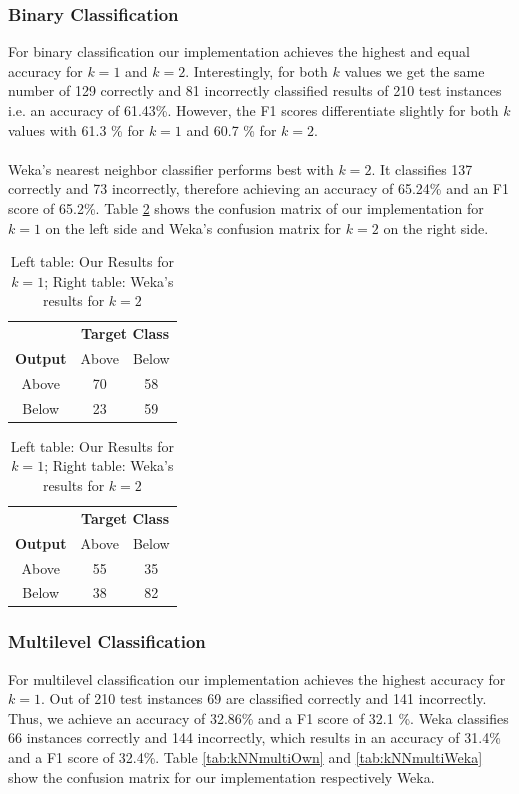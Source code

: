 \subsubsection{Binary Classification}
For binary classification our implementation achieves the highest and equal accuracy for $ k = 1 $ and $ k = 2$. Interestingly, for both $k$ values we get the same number of 129 correctly and 81 incorrectly classified results of 210 test instances i.e. an accuracy of 61.43\%. However, the F1 scores differentiate slightly for both $k$ values with 61.3 \% for $k = 1$ and 60.7 \% for $k = 2$. \\
\\
Weka's nearest neighbor classifier performs best with $k = 2$. It classifies 137 correctly and 73 incorrectly, therefore achieving an accuracy of 65.24\% and an F1 score of 65.2\%. Table \ref{tab:kNNbin} shows the confusion matrix of our implementation for $k=1$ on the left side and Weka's confusion matrix for $k = 2$ on the right side.
\begin{table}[h]
\begin{center}
  \begin{tabular}{c|cc}
  & \multicolumn{2}{c}{\textbf{Target Class}} \\
 \textbf{Output} & Above & Below\\ \hline
  Above & 70 & 58 \\
  Below & 23 & 59
\end{tabular}
\quad
\begin{tabular}{c|cc}
  & \multicolumn{2}{c}{\textbf{Target Class}} \\
 \textbf{Output} & Above & Below\\ \hline
  Above & 55 & 35 \\
  Below & 38 & 82
\end{tabular}
\caption{Left table: Our Results for $k = 1$; Right table: Weka's results for $k = 2$ }
\label{tab:kNNbin}
\end{center}
\end{table}

\subsubsection{Multilevel Classification}
For multilevel classification our implementation achieves the highest accuracy for $ k = 1$. Out of 210 test instances 69 are classified correctly and 141 incorrectly. Thus, we achieve an accuracy of 32.86\% and a F1 score of 32.1 \%.  Weka classifies 66 instances correctly and 144 incorrectly, which results in an accuracy of 31.4\% and a F1 score of 32.4\%. Table \ref{tab:kNNmultiOwn} and \ref{tab:kNNmultiWeka} show the confusion matrix for our implementation respectively Weka.

